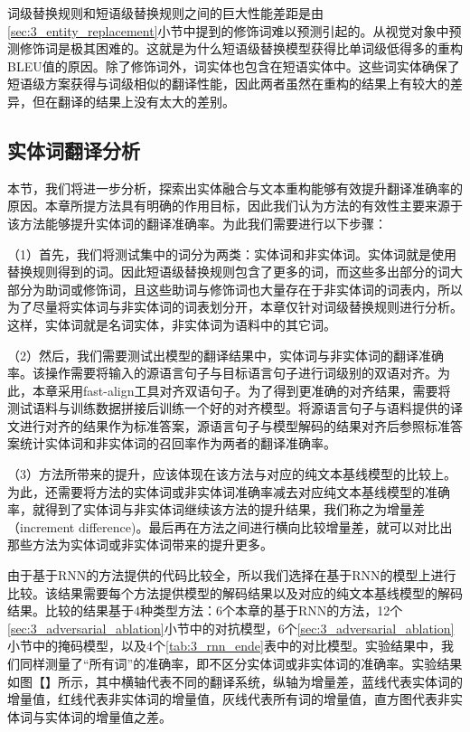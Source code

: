 词级替换规则和短语级替换规则之间的巨大性能差距是由\ref{sec:3_entity_replacement}小节中提到的修饰词难以预测引起的。从视觉对象中预测修饰词是极其困难的。这就是为什么短语级替换模型获得比单词级低得多的重构BLEU值的原因。除了修饰词外，词实体也包含在短语实体中。这些词实体确保了短语级方案获得与词级相似的翻译性能，因此两者虽然在重构的结果上有较大的差异，但在翻译的结果上没有太大的差别。

\subsection{实体词翻译分析}
本节，我们将进一步分析，探索出实体融合与文本重构能够有效提升翻译准确率的原因。本章所提方法具有明确的作用目标，因此我们认为方法的有效性主要来源于该方法能够提升实体词的翻译准确率。为此我们需要进行以下步骤：

（1）首先，我们将测试集中的词分为两类：实体词和非实体词。实体词就是使用替换规则得到的词。因此短语级替换规则包含了更多的词，而这些多出部分的词大部分为助词或修饰词，且这些助词与修饰词也大量存在于非实体词的词表内，所以为了尽量将实体词与非实体词的词表划分开，本章仅针对词级替换规则进行分析。这样，实体词就是名词实体，非实体词为语料中的其它词。

（2）然后，我们需要测试出模型的翻译结果中，实体词与非实体词的翻译准确率。该操作需要将输入的源语言句子与目标语言句子进行词级别的双语对齐。为此，本章采用fast-align\cite{45_dyer-etal-2013-simple}工具对齐双语句子。为了得到更准确的对齐结果，需要将测试语料与训练数据拼接后训练一个好的对齐模型。将源语言句子与语料提供的译文进行对齐的结果作为标准答案，源语言句子与模型解码的结果对齐后参照标准答案统计实体词和非实体词的召回率作为两者的翻译准确率。

（3）方法所带来的提升，应该体现在该方法与对应的纯文本基线模型的比较上。为此，还需要将方法的实体词或非实体词准确率减去对应纯文本基线模型的准确率，就得到了实体词与非实体词继续该方法的提升结果，我们称之为增量差（increment difference)。最后再在方法之间进行横向比较增量差，就可以对比出那些方法为实体词或非实体词带来的提升更多。

由于基于RNN的方法提供的代码比较全，所以我们选择在基于RNN的模型上进行比较。该结果需要每个方法提供模型的解码结果以及对应的纯文本基线模型的解码结果。比较的结果基于4种类型方法：6个本章的基于RNN的方法，12个\ref{sec:3_adversarial_ablation}小节中的对抗模型，6个\ref{sec:3_adversarial_ablation}小节中的掩码模型，以及4个\ref{tab:3_rnn_ende}表中的对比模型。实验结果中，我们同样测量了“所有词”的准确率，即不区分实体词或非实体词的准确率。实验结果如图【】所示，其中横轴代表不同的翻译系统，纵轴为增量差，蓝线代表实体词的增量值，红线代表非实体词的增量值，灰线代表所有词的增量值，直方图代表非实体词与实体词的增量值之差。

